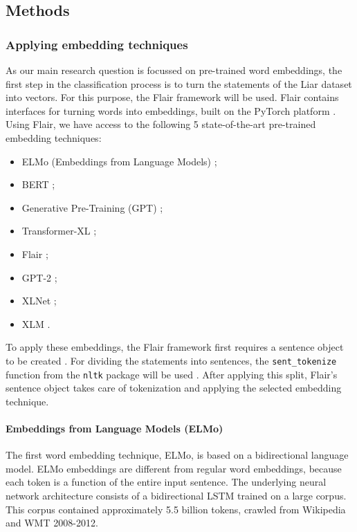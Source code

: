 \subsection{Methods}

\subsubsection{Applying embedding techniques}
As our main research question is focussed on pre-trained word embeddings, the first step in the classification process is to turn the statements of the Liar dataset into vectors. 
For this purpose, the Flair framework will be used. 
Flair contains interfaces for turning words into embeddings, built on the PyTorch platform \cite{flairrepo}\cite{pytorch}. 
Using Flair, we have access to the following 5 state-of-the-art pre-trained embedding techniques: 
\begin{itemize}
    \item ELMo (Embeddings from Language Models) \cite{peters2018};
    \item BERT \cite{devlin2018};
    \item Generative Pre-Training (GPT) \cite{radford2018};
    \item Transformer-XL \cite{dai2019};
    \item Flair \cite{akbik2019};
    \item GPT-2 \cite{radford2019};
    \item XLNet ;
    \item XLM .
\end{itemize}

To apply these embeddings, the Flair framework first requires a sentence object to be created \cite{flairsentence}.
For dividing the statements into sentences, the \texttt{sent\_tokenize} function from the \texttt{nltk} package will be used \cite{nltktokenize}. 
After applying this split, Flair's sentence object takes care of tokenization and applying the selected embedding technique.

\paragraph{Embeddings from Language Models (ELMo)}
The first word embedding technique, ELMo, is based on a bidirectional language model. 
ELMo embeddings are different from regular word embeddings, because each token is a function of the entire input sentence.
The underlying neural network architecture consists of a bidirectional LSTM trained on a large corpus.
This corpus contained approximately 5.5 billion tokens, crawled from Wikipedia and WMT 2008-2012.

